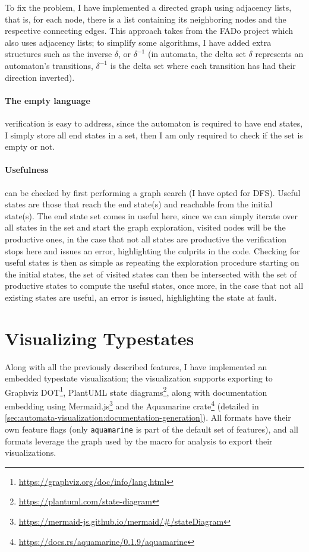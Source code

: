 To fix the problem, I have implemented a directed graph using adjacency lists, that is, for each node,
there is a list containing its neighboring nodes and the respective connecting edges.
This approach takes from the FADo project which also uses adjacency lists; to simplify some algorithms, %
I have added extra structures such as the inverse $\delta$, or $\delta^{-1}$
(in automata, the delta set $\delta$ represents an automaton's transitions,
$\delta^{-1}$ is the delta set where each transition has had their direction inverted).

\paragraph{The empty language} verification is easy to address, since the automaton is required to have end states,
I simply store all end states in a set, then I am only required to check if the set is empty or not.

\paragraph{Usefulness} can be checked by first performing a graph search (I have opted for \gls{DFS}).
Useful states are those that reach the end state(s)  and reachable from the initial state(s).
The end state set comes in useful here, since we can simply iterate over all states in the set and start the graph exploration,
visited nodes will be the productive ones, in the case that not all states are productive the verification stops here and issues an error,
highlighting the culprits in the code.
Checking for useful states is then as simple as repeating the exploration procedure starting on the initial states,
the set of visited states can then be intersected with the set of productive states to compute the useful states,
once more, in the case that not all existing states are useful, an error is issued, highlighting the state at fault.

\section{Visualizing Typestates}\label{sec:automata-visualization}

Along with all the previously described features, I have implemented an embedded typestate visualization;
the visualization supports exporting to Graphviz DOT\footnote{\url{https://graphviz.org/doc/info/lang.html}},
PlantUML state diagrams\footnote{\url{https://plantuml.com/state-diagram}},
along with documentation embedding using Mermaid.js\footnote{\url{https://mermaid-js.github.io/mermaid/\#/stateDiagram}}
and the Aquamarine crate\footnote{\url{https://docs.rs/aquamarine/0.1.9/aquamarine}} (detailed in \autoref{sec:automata-visualization:documentation-generation}).
All formats have their own feature flags (only \texttt{aquamarine} is part of the default set of features),
and all formats leverage the graph used by the macro for analysis to export their visualizations.

